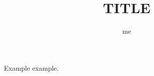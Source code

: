 \documentclass{book}
\title{TITLE}
\author{me}
\begin{document}
\maketitle
Example example.
\end{document}

